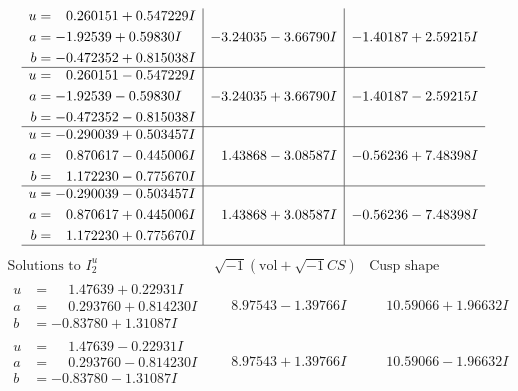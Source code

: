 \documentclass[1p]{elsarticle_modified}
\theoremstyle{definition}
\newcommand{\I}{\sqrt{-1}}
\begin{document}
$$\begin{array}{c|c|c}
\begin{aligned}
u &= \phantom{-}0.260151 + 0.547229 I \\
a &= -1.92539 + 0.59830 I \\
b &= -0.472352 + 0.815038 I\end{aligned}
 & -3.24035 - 3.66790 I & -1.40187 + 2.59215 I \\ \hline\begin{aligned}
u &= \phantom{-}0.260151 - 0.547229 I \\
a &= -1.92539 - 0.59830 I \\
b &= -0.472352 - 0.815038 I\end{aligned}
 & -3.24035 + 3.66790 I & -1.40187 - 2.59215 I \\ \hline\begin{aligned}
u &= -0.290039 + 0.503457 I \\
a &= \phantom{-}0.870617 - 0.445006 I \\
b &= \phantom{-}1.172230 - 0.775670 I\end{aligned}
 & \phantom{-}1.43868 - 3.08587 I & -0.56236 + 7.48398 I \\ \hline\begin{aligned}
u &= -0.290039 - 0.503457 I \\
a &= \phantom{-}0.870617 + 0.445006 I \\
b &= \phantom{-}1.172230 + 0.775670 I\end{aligned}
 & \phantom{-}1.43868 + 3.08587 I & -0.56236 - 7.48398 I\\
 \hline 
 \end{array}$$\newpage$$\begin{array}{c|c|c}  
\text{Solutions to }I^u_{2}& \I (\text{vol} + \sqrt{-1}CS) & \text{Cusp shape}\\
 \hline 
\begin{aligned}
u &= \phantom{-}1.47639 + 0.22931 I \\
a &= \phantom{-}0.293760 + 0.814230 I \\
b &= -0.83780 + 1.31087 I\end{aligned}
 & \phantom{-}8.97543 - 1.39766 I & \phantom{-}10.59066 + 1.96632 I \\ \hline\begin{aligned}
u &= \phantom{-}1.47639 - 0.22931 I \\
a &= \phantom{-}0.293760 - 0.814230 I \\
b &= -0.83780 - 1.31087 I\end{aligned}
 & \phantom{-}8.97543 + 1.39766 I & \phantom{-}10.59066 - 1.96632 I \\ \hline\begin{aligned}

\end{aligned}
\end{array}$$
\end{document}
